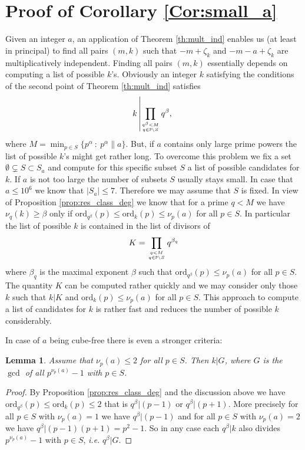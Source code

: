 \documentclass{amsart}
\theoremstyle{plain}
\numberwithin{equation}{section}
\newtheorem{lemma}[thm]{Lemma}
\theoremstyle{remark}
\begin{document}
\section{Proof of Corollary \ref{Cor:small_a}}\label{Sec:Algorithm}

Given an integer $a$, an application of Theorem \ref{th:mult_ind}
enables us (at least in principal) to find all pairs $(m,k)$ such that
$-m+\zeta_k$ and $-m-a+\zeta_k$ are multiplicatively
independent. Finding all pairs $(m,k)$ essentially depends on
computing a list of possible $k$'s. Obviously an integer $k$ satisfying the conditions of the second point of Theorem \ref{th:mult_ind} satisfies
$$k\left|\prod_{q^\beta < M\atop q \in {{\mathbb P}}\setminus S}q^\beta,\right.$$
where $M=\min_{p\in S} \{p^\alpha\: :\:p^\alpha \| a\}$. But, if $a$
contains only large prime powers the list of possible $k$'s might get
rather long. To overcome this problem we fix a set $\emptyset
\subsetneq S\subset S_a$ and compute for this specific subset $S$ a
list of possible candidates for $k$. If $a$ is not too large the
number of subsets $S$ usually stays small. In case that $a\leq 10^6$
we know that $|S_a|\leq 7$. Therefore we may assume that $S$ is
fixed. In view of Proposition \ref{prop:res_class_deg} we know that
for a prime $q<M$ we have $\nu_q(k)\geq \beta$ only if
${\mathrm{ord}}_{q^\beta}(p)\leq{\mathrm{ord}}_k(p)\leq \nu_p(a)$ for all $p\in S$. In
particular the list of possible $k$ is contained in the list of
divisors of \[K=\prod_{q<M \atop q\in {{\mathbb P}}\setminus S} q^{\beta_q}\]
where $\beta_q$ is the maximal exponent $\beta$ such that
${\mathrm{ord}}_{q^\beta}(p)\leq \nu_p(a)$ for all $p\in S$. The quantity $K$
can be computed rather quickly and we may consider only those $k$ such
that $k|K$ and ${\mathrm{ord}}_k(p)\leq \nu_p(a)$ for all $p\in S$.  This
approach to compute a list of candidates for $k$ is rather fast and
reduces the number of possible $k$ considerably.

In case of $a$ being cube-free there is even a stronger criteria:

\begin{lemma}\label{lem:cubefree}
    Assume that $\nu_p(a)\leq 2$ for all $p\in S$. Then $k|G$, where
    $G$ is the $\gcd$ of all $p^{\nu_p(a)}-1$ with $p\in S$.
\end{lemma}

\begin{proof}
By Proposition \ref{prop:res_class_deg} and the discussion above we have ${\mathrm{ord}}_{q^\beta}(p)\leq {\mathrm{ord}}_k(p) \leq 2$
that is $q^\beta|(p-1)$ or $q^\beta|(p+1)$. More precisely for all $p\in S$ with $\nu_p(a)=1$ we have $q^\beta|(p-1)$ and for all $p\in S$ with $\nu_p(a)=2$ 
we have $q^\beta|(p-1)(p+1)=p^2-1$. So in any case each $q^\beta|k$ also divides $p^{\nu_p(a)}-1$ with $p\in S$, \textit{i.e.} $q^\beta|G$.
\end{proof}
\end{document}
